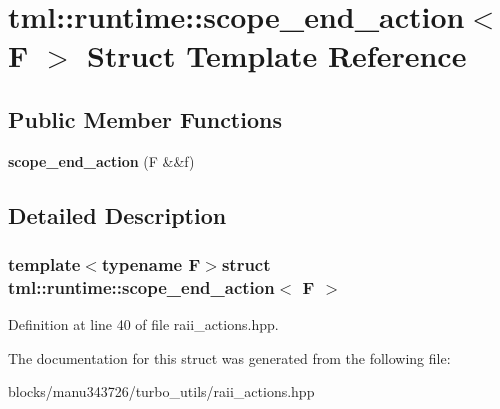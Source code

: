 \hypertarget{structtml_1_1runtime_1_1scope__end__action}{\section{tml\+:\+:runtime\+:\+:scope\+\_\+end\+\_\+action$<$ F $>$ Struct Template Reference}
\label{structtml_1_1runtime_1_1scope__end__action}
}
\subsection*{Public Member Functions}
\begin{DoxyCompactItemize}
\item 
\hypertarget{structtml_1_1runtime_1_1scope__end__action_a6e842e1073f521ad8bfac7dbb343d3ff}{{\bfseries scope\+\_\+end\+\_\+action} (F \&\&f)}\label{structtml_1_1runtime_1_1scope__end__action_a6e842e1073f521ad8bfac7dbb343d3ff}

\end{DoxyCompactItemize}


\subsection{Detailed Description}
\subsubsection*{template$<$typename F$>$struct tml\+::runtime\+::scope\+\_\+end\+\_\+action$<$ F $>$}



Definition at line 40 of file raii\+\_\+actions.\+hpp.



The documentation for this struct was generated from the following file\+:\begin{DoxyCompactItemize}
\item 
blocks/manu343726/turbo\+\_\+utils/raii\+\_\+actions.\+hpp\end{DoxyCompactItemize}
